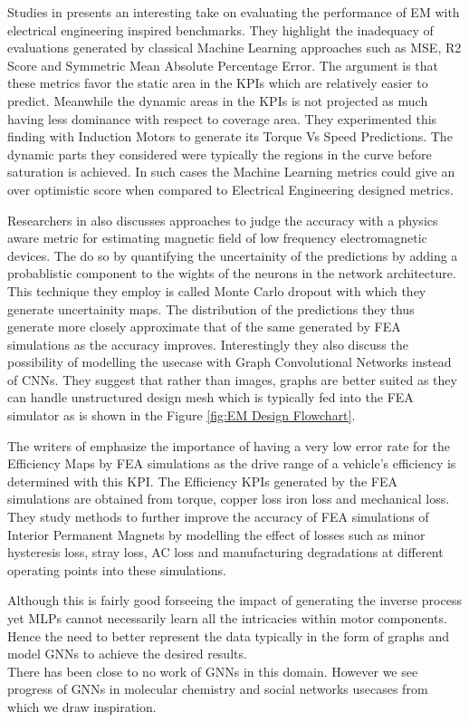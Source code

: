 \documentclass{report} %
\begin{document}
Studies in \cite{EM-PM-2020} presents an interesting take on evaluating the performance of \ac{EM} with electrical engineering inspired benchmarks.
They highlight the inadequacy of evaluations generated by classical Machine Learning approaches such as \ac{MSE}, R2 Score and Symmetric Mean Absolute Percentage Error.
The argument is that these metrics favor the static area in the \ac{KPI}s which are relatively easier to predict.
Meanwhile the dynamic areas in the \ac{KPI}s is not projected as much having less dominance with respect to coverage area.
They experimented this finding with Induction Motors to generate its Torque Vs Speed Predictions. The dynamic parts they considered 
were typically the regions in the curve before saturation is achieved. 
In such cases the Machine Learning metrics could give an over optimistic score when compared to Electrical Engineering designed metrics.

Researchers in \cite{DL-MF-2019} also discusses approaches to judge the accuracy with a physics aware metric for estimating 
magnetic field of low frequency electromagnetic devices. The do so by quantifying the uncertainity of the predictions by adding 
a probablistic component to the wights of the neurons in the network architecture. This technique they employ is called Monte Carlo dropout 
with which they generate uncertainity maps. 
The distribution of the predictions they thus generate more closely approximate that of the same generated by \ac{FEA} simulations as the accuracy improves.
Interestingly they also discuss the possibility of modelling the usecase with Graph Convolutional Networks instead of \ac{CNN}s.
They suggest that rather than images, graphs are better suited as they can handle unstructured design mesh which is 
typically fed into the \ac{FEA} simulator as is shown in the Figure \ref{fig:EM Design Flowchart}.

The writers of \cite{ETA-LA-2020} emphasize the importance of having a very low error rate for the Efficiency Maps by \ac{FEA} simulations 
as the drive range of a vehicle's efficiency is determined with this \ac{KPI}. 
The Efficiency \ac{KPI}s generated by the \ac{FEA} simulations are obtained from torque, copper loss iron loss and mechanical loss.
They study methods to further improve the accuracy of \ac{FEA} simulations of Interior Permanent Magnets by modelling the effect 
of losses such as minor hysteresis loss, stray loss, AC loss and manufacturing degradations at different operating points into these simulations.

Although this is fairly good forseeing the impact of generating the inverse process yet \ac{MLP}s cannot necessarily learn all the intricacies within motor components. \\
Hence the need to better represent the data typically in the form of graphs and model \ac{GNN}s to achieve the desired results. \\
There has been close to no work of \ac{GNN}s in this domain. 
However we see progress of \ac{GNN}s in molecular chemistry and social networks usecases from which we draw inspiration.\\
\end{document}
